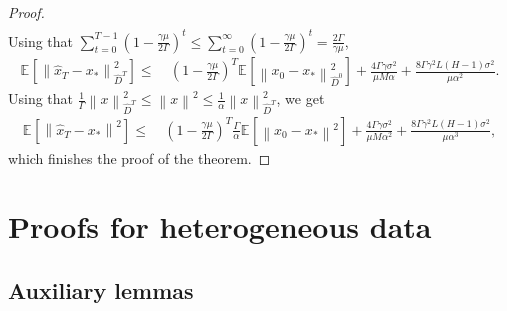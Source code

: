 \documentclass[sn-mathphys,Numbered]{sn-jnl}%
\renewcommand{\|}{\parallel}
\newcommand\ec[2][]{\ensuremath{\mathbb{E}_{#1} \left[#2\right]}}
\newcommand\ecn[3][]{\ec[#1]{\norm{#2}^2_{#3}}}
\newcommand\br[1]{\left ( #1 \right )}
\newcommand{\norm}[1]{\left\lVert#1\right\rVert}
\newcommand{\sqn}[1]{{\left\lVert#1\right\rVert}^2}
\renewcommand {\*} {\ast}
\begin{document}
\begin{proof}
\begin{align*}
     \end{align*}
     Using that $\sum\limits_{t=0}^{T-1} \br{1 - \frac{\gamma\mu}{2\Gamma}}^{t} \leq \sum\limits_{t=0}^{\infty} \br{1 - \frac{\gamma\mu}{2\Gamma}}^{t} = \frac{2\Gamma}{\gamma \mu}$,
     \begin{align*}
         \ecn{\hat{x}_T-x_\ast}{\hat{D}^{T}} \leq&\ \br{1 - \frac{\gamma\mu}{2\Gamma}}^{T} \ecn{x_0-x_\ast}{\hat{D}^{0}} + \frac{4\Gamma\gamma \sigma^2}{\mu M \alpha} + \frac{8 \Gamma\gamma^2 L \br{H - 1} \sigma^2}{\mu\alpha^2}.
     \end{align*}
     Using that $\frac{1}{\Gamma}\sqn{x}_{\hat{D}^T} \leq \sqn{x} \leq \frac{1}{\alpha}\sqn{x}_{\hat{D}^T}$, we get
     \begin{align*}
         \ecn{\hat{x}_T-x_\ast}{} \leq&\ \br{1 - \frac{\gamma\mu}{2\Gamma}}^{T} \frac{\Gamma}{\alpha}\ecn{x_0-x_\ast}{} + \frac{4\Gamma\gamma \sigma^2}{\mu M \alpha^2} + \frac{8 \Gamma\gamma^2 L \br{H - 1} \sigma^2}{\mu\alpha^3},
     \end{align*}
     which finishes the proof of the theorem.
 \end{proof}

 \section{\bf Proofs for heterogeneous data} \label{hetero}
\subsection{\bf Auxiliary lemmas}
\end{document}
